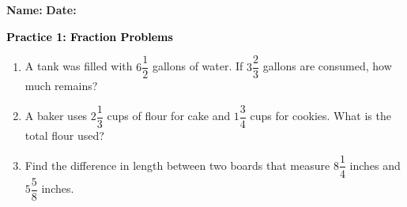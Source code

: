 \documentclass[12pt, letterpaper, fleqn]{article}
\begin{document}
\textbf{Name:} \underline{\hspace{5cm}}
\hfill
\textbf{Date:} \underline{\hspace{3cm}}\\

\begin{tcolorbox}[colback=customteal!20]
    \large\textcolor{black}{\textbf{Practice 1: Fraction Problems}}
\end{tcolorbox}
\begin{enumerate}[itemsep=3.5cm, leftmargin=0.6cm]
\item A tank was filled with $6\dfrac{1}{2}$ gallons of water. If $3\dfrac{2}{3}$ gallons are consumed, how much remains?
\vspace{3.5cm}
\item A baker uses $2\dfrac{1}{3}$ cups of flour for cake and $1\dfrac{3}{4}$ cups for cookies. What is the total flour used?
\vspace{3.5cm}
\item Find the difference in length between two boards that measure $8\dfrac{1}{4}$ inches and $5\dfrac{5}{8}$ inches.
\end{enumerate}
\end{document}
